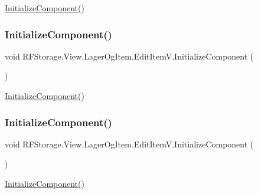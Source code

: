\mbox{\hyperlink{class_r_f_storage_1_1_view_1_1_lager_og_item_1_1_edit_item_v_aa9126c5d0f8c80176b47690bc8a76eb2}{Initialize\+Component()}} 

\mbox{\label{class_r_f_storage_1_1_view_1_1_lager_og_item_1_1_edit_item_v_aa9126c5d0f8c80176b47690bc8a76eb2}} 
\subsubsection{\texorpdfstring{InitializeComponent()}{InitializeComponent()}\hspace{0.1cm}{\footnotesize\ttfamily [3/8]}}
{\footnotesize\ttfamily void R\+F\+Storage.\+View.\+Lager\+Og\+Item.\+Edit\+Item\+V.\+Initialize\+Component (\begin{DoxyParamCaption}{ }\end{DoxyParamCaption})}



\mbox{\hyperlink{class_r_f_storage_1_1_view_1_1_lager_og_item_1_1_edit_item_v_aa9126c5d0f8c80176b47690bc8a76eb2}{Initialize\+Component()}} 

\mbox{\label{class_r_f_storage_1_1_view_1_1_lager_og_item_1_1_edit_item_v_aa9126c5d0f8c80176b47690bc8a76eb2}} 
\subsubsection{\texorpdfstring{InitializeComponent()}{InitializeComponent()}\hspace{0.1cm}{\footnotesize\ttfamily [4/8]}}
{\footnotesize\ttfamily void R\+F\+Storage.\+View.\+Lager\+Og\+Item.\+Edit\+Item\+V.\+Initialize\+Component (\begin{DoxyParamCaption}{ }\end{DoxyParamCaption})}



\mbox{\hyperlink{class_r_f_storage_1_1_view_1_1_lager_og_item_1_1_edit_item_v_aa9126c5d0f8c80176b47690bc8a76eb2}{Initialize\+Component()}} 

